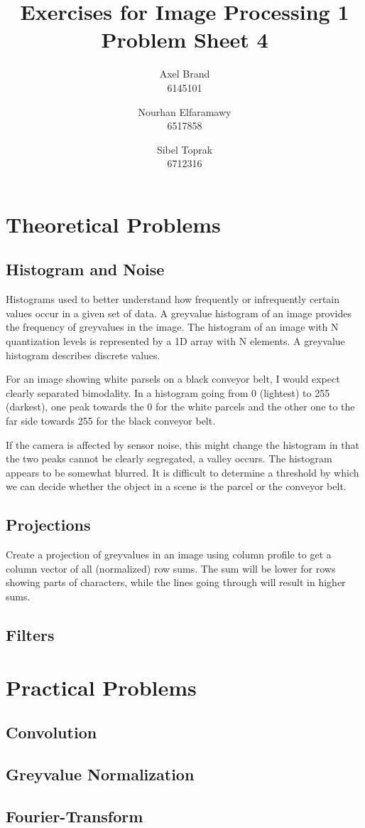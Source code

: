 \documentclass[a4paper,twocolumn]{article}
\title{\textbf{Exercises for Image Processing 1}\\Problem Sheet 4}
\author{Axel Brand\\6145101 \and Nourhan Elfaramawy\\6517858 \and Sibel Toprak\\6712316}
\begin{document}
	\maketitle
	
	\section{Theoretical Problems}
	
	\subsection{Histogram and Noise}
	Histograms used to better understand how frequently or infrequently certain values occur in a given set of data. A greyvalue histogram of an image provides the frequency of greyvalues in the image. The histogram of an image with N quantization levels is represented by a 1D array with N elements. A greyvalue histogram describes discrete values.
	
	For an image showing white parsels on a black conveyor belt, I would expect clearly separated bimodality. In a histogram going from 0 (lightest) to 255 (darkest), one peak towards the 0 for the white parcels and the other one to the far side towards 255 for the black conveyor belt.
	
	If the camera is affected by sensor noise, this might change the histogram in that the two peaks cannot be clearly segregated, a valley occurs. The histogram appears to be somewhat blurred. It is difficult to determine a threshold by which we can decide whether the object in a scene is the parcel or the conveyor belt.
	
	\subsection{Projections}
	
	Create a projection of greyvalues in an image using column profile to get a column vector of all (normalized) row sums. The sum will be lower for rows showing parts of characters, while the lines going through will result in higher sums. 
	
	\subsection{Filters}
	
	
	
	\section{Practical Problems}
	
	\subsection{Convolution}
	
	\subsection{Greyvalue Normalization}
	
	\subsection{Fourier-Transform}
	
\end{document}
